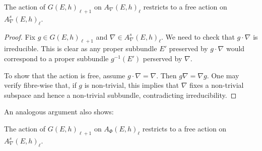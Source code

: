 \documentclass[12pt]{ociamthesis}  %
\begin{document}
\begin{lemma}\label{lem:free_action}
  The action of $G(E,h)_{\ell+1}$ on $A_\nabla(E,h)_\ell$
  restricts to a free action on $A^s_\nabla(E,h)_\ell$.
  \begin{proof}
    Fix $g\in G(E,h)_{\ell+1}$ and $\nabla\in A^s_\nabla(E,h)_\ell$.
    We need to check that $g\cdot\nabla$ is irreducible. This is clear
    as any proper subbundle $E'$ preserved by $g\cdot\nabla$ would correspond
    to a proper subbundle $g^{-1}(E')$  perserved by $\nabla$.

    To show that the action is free, assume $g\cdot\nabla = \nabla$.
    Then $g\nabla = \nabla g$. One may verify fibre-wise that, if $g$
    is non-trivial, this implies that $\nabla$ fixes a non-trivial
    subspace and hence a non-trivial subbundle, contradicting irreducibility.
  \end{proof}
\end{lemma}

An analogous argument also shows:

\begin{lemma}
  The action of $G(E,h)_{\ell+1}$ on $A_\Phi(E,h)_\ell$
  restricts to a free action on $A^{s}_\nabla(E,h)_\ell$.
\end{lemma}
\end{document}

